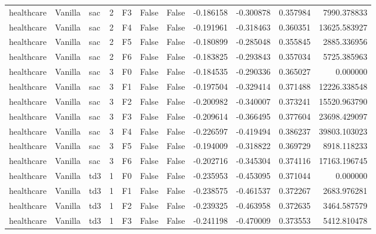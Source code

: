 \begin{tabular}{lllrlllrrrr}
healthcare & Vanilla &       sac &     2 &  F3 &           False &            False & -0.186158 & -0.300878 & 0.357984 &      7990.378833 \\
healthcare & Vanilla &       sac &     2 &  F4 &           False &            False & -0.191961 & -0.318463 & 0.360351 &     13625.583927 \\
healthcare & Vanilla &       sac &     2 &  F5 &           False &            False & -0.180899 & -0.285048 & 0.355845 &      2885.336956 \\
healthcare & Vanilla &       sac &     2 &  F6 &           False &            False & -0.183825 & -0.293843 & 0.357034 &      5725.385963 \\
healthcare & Vanilla &       sac &     3 &  F0 &           False &            False & -0.184535 & -0.290336 & 0.365027 &         0.000000 \\
healthcare & Vanilla &       sac &     3 &  F1 &           False &            False & -0.197504 & -0.329414 & 0.371488 &     12226.338548 \\
healthcare & Vanilla &       sac &     3 &  F2 &           False &            False & -0.200982 & -0.340007 & 0.373241 &     15520.963790 \\
healthcare & Vanilla &       sac &     3 &  F3 &           False &            False & -0.209614 & -0.366495 & 0.377604 &     23698.429097 \\
healthcare & Vanilla &       sac &     3 &  F4 &           False &            False & -0.226597 & -0.419494 & 0.386237 &     39803.103023 \\
healthcare & Vanilla &       sac &     3 &  F5 &           False &            False & -0.194009 & -0.318822 & 0.369729 &      8918.118233 \\
healthcare & Vanilla &       sac &     3 &  F6 &           False &            False & -0.202716 & -0.345304 & 0.374116 &     17163.196745 \\
healthcare & Vanilla &       td3 &     1 &  F0 &           False &            False & -0.235953 & -0.453095 & 0.371044 &         0.000000 \\
healthcare & Vanilla &       td3 &     1 &  F1 &           False &            False & -0.238575 & -0.461537 & 0.372267 &      2683.976281 \\
healthcare & Vanilla &       td3 &     1 &  F2 &           False &            False & -0.239325 & -0.463958 & 0.372635 &      3464.587579 \\
healthcare & Vanilla &       td3 &     1 &  F3 &           False &            False & -0.241198 & -0.470009 & 0.373553 &      5412.810478 \\

\end{tabular}
